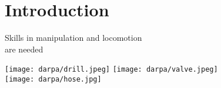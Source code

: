 \section{Introduction}

\begin{frame}{Skills in manipulation and locomotion\\ are needed}
\begin{center}
  \vspace*{0.7cm}
  \texttt{[image: darpa/drill.jpeg]}
  \hspace*{0.5cm}
  \texttt{[image: darpa/valve.jpeg]}\\[0.2cm]
  \texttt{[image: darpa/hose.jpg]}
\end{center}
\end{frame}



